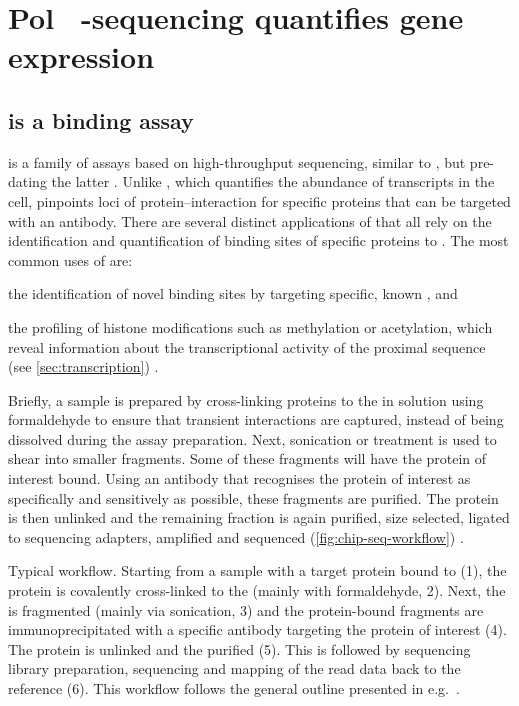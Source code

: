 \section{Pol~ -sequencing quantifies  gene expression}
\label{sec:chip}

\subsection{ is a  binding assay}

 is a family of assays based on high-throughput sequencing,
similar to \rnaseq, but pre-dating the latter \citep{Johnson:2007}. Unlike
\rnaseq, which quantifies the abundance of \rna transcripts in the cell,
\chipseq pinpoints loci of protein--\dna interaction for specific proteins that
can be targeted with an antibody. There are several distinct applications of
\chipseq that all rely on the identification and quantification of binding sites
of specific proteins to \dna. The most common uses of \chipseq are:
\begin{enumerate*}
    \item the identification of novel \tf binding sites by targeting specific,
        known \tf[s], and
    \item the profiling of histone modifications such as methylation or
        acetylation, which reveal information about the transcriptional activity
        of the proximal sequence (see \cref{sec:transcription})
        \citep{Barski:2007}.
\end{enumerate*}

Briefly, a sample is prepared by cross-linking proteins to the \dna in solution
using formaldehyde to ensure that transient interactions are captured, instead
of being dissolved during the assay preparation. Next, sonication or
 treatment is used to shear \dna into smaller
fragments. Some of these fragments will have the protein of interest bound.
Using an antibody that recognises the protein of interest as specifically and
sensitively as possible, these fragments are purified. The protein is then
unlinked and the remaining \dna fraction is again purified, size selected,
ligated to sequencing adapters, amplified and sequenced
(\cref{fig:chip-seq-workflow}) \citep{Park:2009}.

    {Typical \chipseq workflow.}
    {Starting from a sample with a target protein bound to \dna (\num{1}),
    the protein is covalently cross-linked to the \dna (mainly with
    formaldehyde, \num{2}). Next, the \dna is fragmented (mainly via sonication,
    \num{3}) and the protein-bound fragments are immunoprecipitated with a
    specific antibody targeting the protein of interest (\num{4}). The protein
    is unlinked and the \dna purified (\num{5}). This is followed by sequencing
    library preparation, sequencing and mapping of the read data back to the
    reference (\num{6}). This workflow follows the general outline presented in
    e.g.\ \citet{Landt:2012}.}

